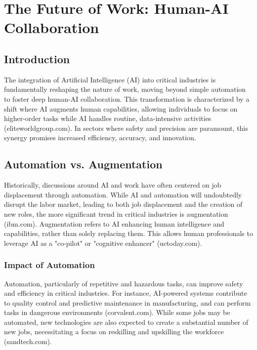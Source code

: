 \chapter{The Future of Work: Human-AI Collaboration}
\section{Introduction}
The integration of Artificial Intelligence (AI) into critical industries is fundamentally reshaping the nature of work, moving beyond simple automation to foster deep human-AI collaboration. This transformation is characterized by a shift where AI augments human capabilities, allowing individuals to focus on higher-order tasks while AI handles routine, data-intensive activities (eliteworldgroup.com). In sectors where safety and precision are paramount, this synergy promises increased efficiency, accuracy, and innovation.

\section{Automation vs. Augmentation}
Historically, discussions around AI and work have often centered on job displacement through automation. While AI and automation will undoubtedly disrupt the labor market, leading to both job displacement and the creation of new roles, the more significant trend in critical industries is augmentation (ibm.com). Augmentation refers to AI enhancing human intelligence and capabilities, rather than solely replacing them. This allows human professionals to leverage AI as a "co-pilot" or "cognitive enhancer" (uctoday.com).

\subsection{Impact of Automation}
Automation, particularly of repetitive and hazardous tasks, can improve safety and efficiency in critical industries. For instance, AI-powered systems contribute to quality control and predictive maintenance in manufacturing, and can perform tasks in dangerous environments (corvalent.com). While some jobs may be automated, new technologies are also expected to create a substantial number of new jobs, necessitating a focus on reskilling and upskilling the workforce (sandtech.com).

